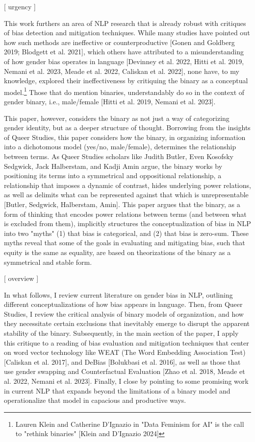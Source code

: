 \documentclass[11pt]{article}
\begin{document}
[ urgency ]

This work furthers an area of NLP research that is already robust with
critiques of bias detection and mitigation techniques. While many
studies have pointed out how such methods are ineffective or
counterproductive [Gonen and Goldberg 2019; Blodgett et al. 2021],
which others have attributed to a misunderstanding of how gender bias
operates in language [Devinney et al. 2022, Hitti et al. 2019, Nemani
et al. 2023, Meade et al. 2022, Caliskan et al. 2022], none have, to
my knowledge, explored their ineffectiveness by critiquing the binary
as a conceptual model.\footnote{Lauren Klein and Catherine D'Ignazio in "Data Feminism for AI"
is the call to "rethink binaries" [Klein and D'Ignazio 2024]} Those that do mention binaries,
understandably do so in the context of gender binary, i.e.,
male/female [Hitti et al. 2019, Nemani et al. 2023].

This paper, however, considers the binary as not just a way of
categorizing gender identity, but as a deeper structure of thought.
Borrowing from the insights of Queer Studies, this paper considers how
the binary, in organizing information into a dichotomous model
(yes/no, male/female), determines the relationship between terms. As
Queer Studies scholars like Judith Butler, Even Kosofsky Sedgwick,
Jack Halberstam, and Kadji Amin argue, the binary works by positioning
its terms into a symmetrical and oppositional relationship, a
relationship that imposes a dynamic of contrast, hides underlying
power relations, as well as delimits what can be represented against
that which is unrepresentable [Butler, Sedgwick, Halberstam, Amin].
This paper argues that the binary, as a form of thinking that encodes
power relations between terms (and between what is excluded from
them), implicitly structures the conceptualization of bias in NLP into
two "myths" (1) that bias is categorical, and (2) that bias is
zero-sum. These myths reveal that some of the goals in evaluating and
mitigating bias, such that equity is the same as equality, are based
on theorizations of the binary as a symmetrical and stable form.

[ overview ] 

In what follows, I review current literature on gender bias in NLP,
outlining different conceptualizations of how bias appears in
language. Then, from Queer Studies, I review the critical analysis of
binary models of organization, and how they necessitate certain
exclusions that inevitably emerge to disrupt the apparent stability of
the binary. Subsequently, in the main section of the paper, I apply
this critique to a reading of bias evaluation and mitigation
techniques that center on word vector technology like WEAT (The Word
Embedding Association Test) [Caliskan et al. 2017], and DeBias
[Bolukbasi et al. 2016], as well as those that use gender swapping and
Counterfactual Evaluation [Zhao et al. 2018, Meade et al. 2022, Nemani
et al. 2023]. Finally, I close by pointing to some promising work in
current NLP that expands beyond the limitations of a binary model and
operationalize that model in capacious and productive ways.
\end{document}
